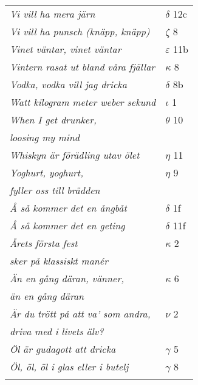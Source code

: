 \documentclass[a6paper,10pt]{article}
\begin{document}
\newpage
\setlength{\oddsidemargin}{-0.37in}
\begin{table}[!]
\begin{tabular}{l l}
\textit{Vi vill ha mera järn}	&$\delta$ 12c\\
\textit{Vi vill ha punsch (knäpp, knäpp)}	&$\zeta$ 8\\
\textit{Vinet väntar, vinet väntar}	&$\varepsilon$ 11b\\
\textit{Vintern rasat ut bland våra fjällar}	&$\kappa$ 8\\
\textit{Vodka, vodka vill jag dricka}	&$\delta$ 8b\\
\textit{Watt kilogram meter weber sekund}	&$\iota$ 1\\
\textit{When I get drunker,}	&$\theta$ 10\\
\textit{loosing my mind} &\\
\textit{Whiskyn är förädling utav ölet}	&$\eta$ 11\\
\textit{Yoghurt, yoghurt,}	&$\eta$ 9\\
\textit{fyller oss till brädden} &\\
\textit{Å så kommer det en ångbåt}	&$\delta$ 1f\\
\textit{Å så kommer det en geting}	&$\delta$ 11f\\
\textit{Årets första fest}	&$\kappa$ 2\\
\textit{sker på klassiskt manér} &\\
\textit{Än en gång däran, vänner,}	&$\kappa$ 6\\
\textit{än en gång däran} &\\
\textit{Är du trött på att va' som andra,}	&$\nu$ 2\\
\textit{driva med i livets älv?} &\\
\textit{Öl är gudagott att dricka}	&$\gamma$ 5\\
\textit{Öl, öl, öl i glas eller i butelj}	&$\gamma$ 8\\ 
\vspace{150pt}
\end{tabular}
\end{table}
\end{document}
